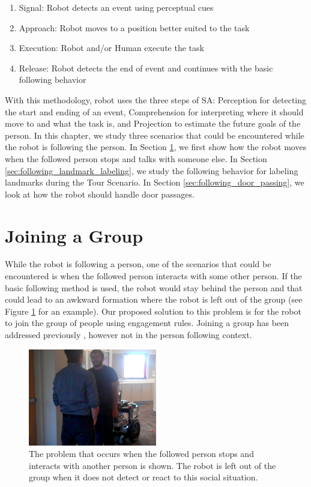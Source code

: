 \begin{enumerate}
\item Signal: Robot detects an event using perceptual cues
\item Approach: Robot moves to a position better suited to the task
\item Execution: Robot and/or Human execute the task
\item Release: Robot detects the end of event and continues with the basic following behavior
\end{enumerate}

With this methodology, robot uses the three steps of SA: Perception for detecting the start and ending of an event, Comprehension for interpreting where it should move to and what the task is, and Projection to estimate the future goals of the person. In this chapter, we study three scenarios that could be encountered while the robot is following the person. In Section \ref{sec:following_joining_group}, we first show how the robot moves when the followed person stops and talks with someone else. In Section \ref{sec:following_landmark_labeling}, we study the following behavior for labeling landmarks during the Tour Scenario. In Section \ref{sec:following_door_passing}, we look at how the robot should handle door passages.


\section{Joining a Group}
\label{sec:following_joining_group}

While the robot is following a person, one of the scenarios that could be encountered is when the followed person interacts with some other person. If the basic following method is used, the robot would stay behind the person and that could lead to an awkward formation where the robot is left out of the group (see Figure \ref{fig:group_problem} for an example). Our proposed solution to this problem is for the robot to join the group of people using engagement rules. Joining a group has been addressed previously \cite{althaus2004navigation,setti2015f}, however not in the person following context.

\begin{figure}[ht!]
\centering
\includegraphics[width=0.5\textwidth]{pics/group_problem}
\caption{The problem that occurs when the followed person stops and interacts with another person is shown. The robot is left out of the group when it does not detect or react to this social situation.}
\label{fig:group_problem}
\end{figure}



